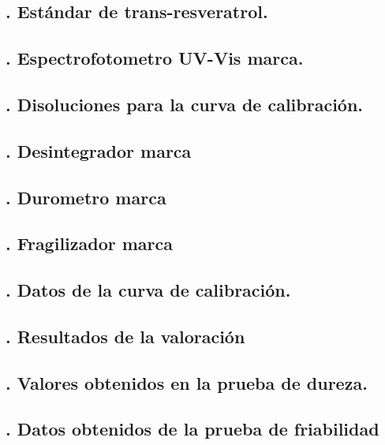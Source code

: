 \subsection*{\theanexo. Estándar de trans-resveratrol.}
\label{anexo:estandar}

\subsection*{\theanexo. Espectrofotometro UV-Vis marca.}
\label{anexo:espectro}

\subsection*{\theanexo. Disoluciones para la curva de calibración.}
\label{anexo:disoluciones}

\subsection*{\theanexo. Desintegrador marca}
\label{anexo:desintegrador}

\subsection*{\theanexo. Durometro marca }
\label{anexo:durometro}

\subsection*{\theanexo. Fragilizador marca}
\label{anexo:fragilizador}

\subsection*{\theanexo. Datos de la curva de calibración.}
\label{anexo:stats}

\subsection*{\theanexo. Resultados de la valoración}
\label{anexo:valoracionresult}

\subsection*{\theanexo. Valores obtenidos en la prueba de dureza.}
\label{anexo:durometroresult}

\subsection*{\theanexo. Datos obtenidos de la prueba de friabilidad}
\label{anexo:friabilidad}
